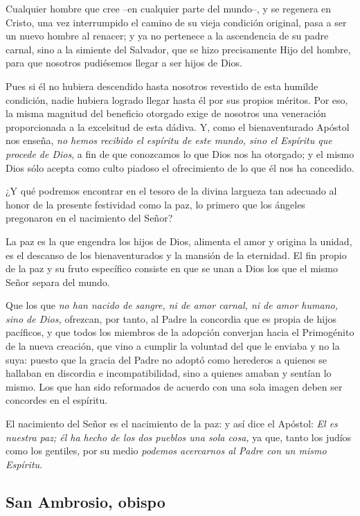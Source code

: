 Cualquier hombre que cree --en cualquier parte del mundo--, y se regenera en Cristo, una vez interrumpido el camino de su vieja condición original, pasa a ser un nuevo hombre al renacer; y ya no pertenece a la ascendencia de su padre carnal, sino a la simiente del Salvador, que se hizo precisamente Hijo del hombre, para que nosotros pudiésemos llegar a ser hijos de Dios.

Pues si él no hubiera descendido hasta nosotros revestido de esta humilde condición, nadie hubiera logrado llegar hasta él por sus propios méritos. Por eso, la misma magnitud del beneficio otorgado exige de nosotros una veneración proporcionada a la excelsitud de esta dádiva. Y, como el bienaventurado Apóstol nos enseña, \emph{no hemos recibido el espíritu de este mundo, sino el Espíritu que procede de Dios}, a fin de que conozcamos lo que Dios nos ha otorgado; y el mismo Dios sólo acepta como culto piadoso el ofrecimiento de lo que él nos ha concedido.

¿Y qué podremos encontrar en el tesoro de la divina largueza tan adecuado al honor de la presente festividad como la paz, lo primero que los ángeles pregonaron en el nacimiento del Señor?

La paz es la que engendra los hijos de Dios, alimenta el amor y origina la unidad, es el descanso de los bienaventurados y la mansión de la eternidad. El fin propio de la paz y su fruto específico consiste en que se unan a Dios los que el mismo Señor separa del mundo.

Que los que \emph{no han nacido de sangre, ni de amor carnal, ni de amor humano, sino de Dios,} ofrezcan, por tanto, al Padre la concordia que es propia de hijos pacíficos, y que todos los miembros de la adopción converjan hacia el Primogénito de la nueva creación, que vino a cumplir la voluntad del que le enviaba y no la suya: puesto que la gracia del Padre no adoptó como herederos a quienes se hallaban en discordia e incompatibilidad, sino a quienes amaban y sentían lo mismo. Los que han sido reformados de acuerdo con una sola imagen deben ser concordes en el espíritu.

El nacimiento del Señor es el nacimiento de la paz: y así dice el Apóstol: \emph{El es nuestra paz; él ha hecho de los dos pueblos una sola cosa,} ya que, tanto los judíos como los gentiles, por su medio \emph{podemos acercarnos al Padre con un mismo Espíritu}.

\subsection{San Ambrosio, obispo}

